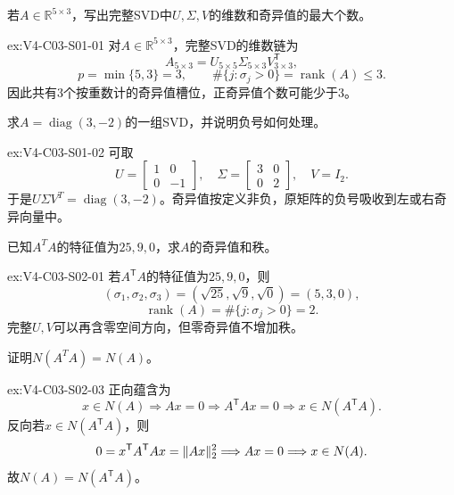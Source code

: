 \begin{SLChapterExercisePairSection}
\begin{exercise}\label{ex:V4-C03-S01-01}
若$A\in\mathbb R^{5\times3}$，写出完整SVD中$U,\Sigma,V$的维数和奇异值的最大个数。
\end{exercise}
\ifSLFullEdition
{}\label{sol:V4-C03-S01-01}
\begin{chapterexercisesolution}{ex:V4-C03-S01-01}
对$A\in\mathbb R^{5\times3}$，完整SVD的维数链为
\[
A_{5\times3}
=U_{5\times5}\Sigma_{5\times3}V_{3\times3}^{\mathsf T},
\]
\[
p=\min\{5,3\}=3,
\qquad
\#\{j:\sigma_j>0\}=\operatorname{rank}(A)\le3.
\]
因此共有3个按重数计的奇异值槽位，正奇异值个数可能少于3。
\end{chapterexercisesolution}
\fi

\begin{exercise}\label{ex:V4-C03-S01-02}
求$A=\operatorname{diag}(3,-2)$的一组SVD，并说明负号如何处理。
\end{exercise}
\ifSLFullEdition
{}\label{sol:V4-C03-S01-02}
\begin{chapterexercisesolution}{ex:V4-C03-S01-02}
可取
\[
U=\begin{bmatrix}1&0\\0&-1\end{bmatrix},\quad
\Sigma=\begin{bmatrix}3&0\\0&2\end{bmatrix},\quad
V=I_2.
\]
于是$U\Sigma V^T=\operatorname{diag}(3,-2)$。奇异值按定义非负，原矩阵的负号吸收到左或右奇异向量中。
\end{chapterexercisesolution}
\fi

\begin{exercise}\label{ex:V4-C03-S02-01}
已知$A^TA$的特征值为$25,9,0$，求$A$的奇异值和秩。
\end{exercise}
\ifSLFullEdition
{}\label{sol:V4-C03-S02-01}
\begin{chapterexercisesolution}{ex:V4-C03-S02-01}
若$A^{\mathsf T}A$的特征值为$25,9,0$，则
\[
(\sigma_1,\sigma_2,\sigma_3)
=(\sqrt{25},\sqrt9,\sqrt0)=(5,3,0),
\]
\[
\operatorname{rank}(A)
=\#\{j:\sigma_j>0\}=2.
\]
完整$U,V$可以再含零空间方向，但零奇异值不增加秩。
\end{chapterexercisesolution}
\fi

\begin{exercise}\label{ex:V4-C03-S02-03}
证明$N(A^TA)=N(A)$。
\end{exercise}
\ifSLFullEdition
{}\label{sol:V4-C03-S02-03}
\begin{chapterexercisesolution}{ex:V4-C03-S02-03}
正向蕴含为
\[
x\in N(A)
\Longrightarrow Ax=0
\Longrightarrow A^{\mathsf T}Ax=0
\Longrightarrow x\in N(A^{\mathsf T}A).
\]
反向若$x\in N(A^{\mathsf T}A)$，则
\[
0=x^{\mathsf T}A^{\mathsf T}Ax
=\lVert Ax\rVert_2^2
\Longrightarrow Ax=0
\Longrightarrow x\in N(A).
\]
故$N(A)=N(A^{\mathsf T}A)$。
\end{chapterexercisesolution}
\fi


\end{SLChapterExercisePairSection}
